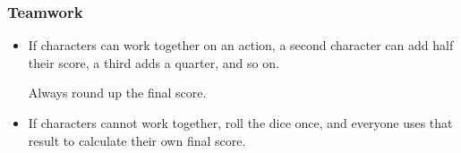 \subsubsection{Teamwork}

\begin{itemize}
  \item
  If characters can work together on an action, a second character can add half their score, a third adds a quarter, and so on.

  Always round up the final score.
  \item
  If characters cannot work together, roll the dice once, and everyone uses that result to calculate their own final score.
\end{itemize}
